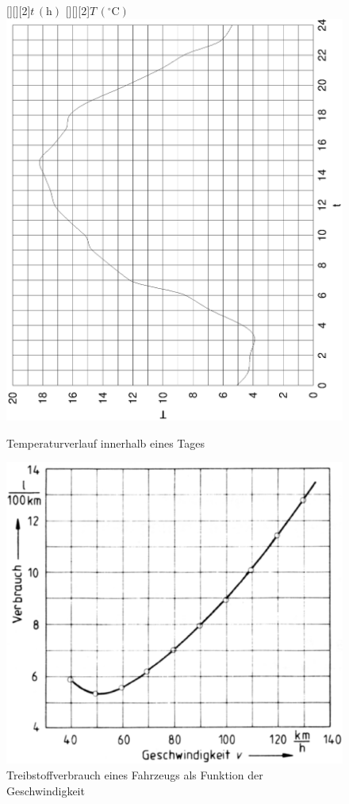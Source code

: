 \documentclass[%
11pt,%
twoside,%
titlepage,%
german,%
headsepline%
]{scrartcl}
\begin{document}
\begin{figure}[b!]
  \centering
  [][][2]{$t\,(\mathrm{h})$} [][][2]{$T\,(^\circ\mathrm{C})$}
  \includegraphics[angle=-90,width=0.9\columnwidth]{pictures/temp.eps}
  \caption{Temperaturverlauf innerhalb eines Tages}
  \label{fig:linfkt1:temp}
\end{figure}

\begin{figure}[b!]
  	\includegraphics[width=0.9\columnwidth,bb=14 14 630 566]{pictures/treibstoff.eps}
  \caption{Treibstoffverbrauch eines Fahrzeugs als Funktion der Geschwindigkeit}
  \label{fig:linfkt1:treibstoff}
\end{figure}
\end{document}
